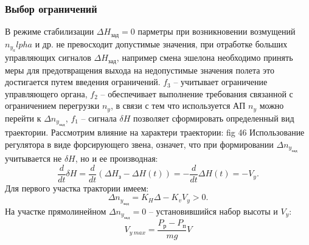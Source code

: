 \documentclass{article}
\begin{document}
\subsubsection{Выбор ограничений}
В режиме стабилизации $\Delta H_{зад} = 0$ парметры при возникновении возмущений $n_y_alpha$ и др. не превосходит допустимые значения, при отработке больших управляющих сигналов $\Delta H_{зад}$, например смена эшелона необходимо принять меры для предотвращения выхода на недопустимые значения полета это достигается путем введения ограничений.    
$f_3$ -- учитывает ограничение управляющего органа, $f_2$ -- обеспечивает выполнение требования связанной с ограничением перегрузки $n_y$, в связи с тем что используется АП $n_y$ можно перейти к $ \Delta n_y_{зад}$, $f_1$ -- сигнала $\delta H$ позволяет сформировать определенный вид траектории. Рассмотрим влияние на характери траектории:
fig 46
Использование регулятора в виде форсирующего звена, означет, что при формировании $ \Delta n_y_{зад}$ учитывается не $\delta H$, но и ее производная:
\[
    \frac{d}{dt} \delta H = \frac{d}{dt} (\Delta H_з - \Delta H (t)) = - \frac{d}{dt} \Delta H(t) = -V_y
.\]
Для первого участка трактории имеем:
\[
    \Delta n_y_{зад} = K_H \Delta - K_v V_y > 0
.\]
На участке прямолинейном $ \Delta n_y_{зад} = 0$ -- установившийся набор высоты и $V_y$:
\[
    V_{y \ max} = \frac{P_р - P_п}{mg}V
\]
\end{document}
